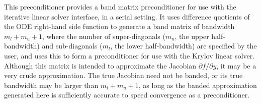 This preconditioner provides a band matrix preconditioner for use with
the {\cvspils} iterative linear solver interface, in a serial setting.
It uses difference quotients of the ODE right-hand side function  to
generate a band matrix of bandwidth $m_l + m_u + 1$, where the number of
super-diagonals ($m_u$, the upper half-bandwidth) and sub-diagonals
($m_l$, the lower half-bandwidth) are specified by the user, and uses this to
form a preconditioner for use with the Krylov linear solver.
Although this matrix is intended to approximate the Jacobian
$\partial f / \partial y$, it may be a very crude approximation.  The true Jacobian
need not be banded, or its true bandwidth may be larger than $m_l + m_u + 1$, as
long as the banded approximation generated here is sufficiently accurate to
speed convergence as a preconditioner.

